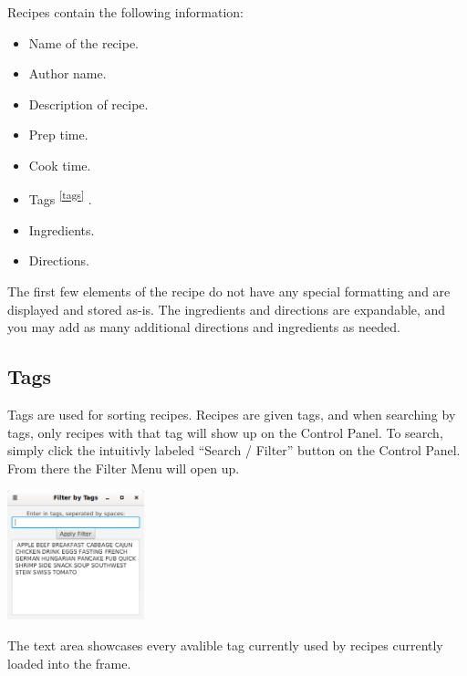 \documentclass{article}
\begin{document}
Recipes contain the following information:

\begin{itemize}
\item{Name of the recipe.}
\item{Author name.}
\item{Description of recipe.}
\item{Prep time.}
\item{Cook time.}
\item{Tags\textsuperscript{ \ref{tags} }. }
\item{Ingredients.}
\item{Directions.}
\end{itemize}

The first few elements of the recipe do not have any special
formatting and are displayed and stored as-is. The ingredients and
directions are expandable, and you may add as many additional
directions and ingredients as needed. 

\subsection{Tags\label{tags}}

Tags are used for sorting recipes. Recipes are given tags, and when
searching by tags, only recipes with that tag will show up on the
Control Panel. To search, simply click the intuitivly labeled ``Search
/ Filter'' button on the Control Panel. From there the Filter Menu
will open up.

\begin{center}
  \includegraphics[width=150px]{img/filter.png}
\end{center}

The text area showcases every avalible tag currently used by recipes
currently loaded into the frame.
\end{document}

